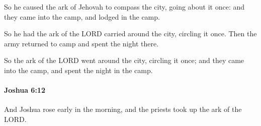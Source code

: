 			\begin{versebox}
					\item[BHS] 
					\item[ASV] So he caused the ark of Jehovah to compass the city, going about it once: and they came into the camp, and lodged in the camp.
					\item[NIV] So he had the ark of the LORD carried around the city, circling it once. Then the army returned to camp and spent the night there.
					\item[NRSV] So the ark of the LORD went around the city, circling it once; and they came into the camp, and spent the night in the camp.
			\end{versebox}

		\paragraph{Joshua 6:12} %
			\label{JOSHUA-6-12}

			And Joshua rose early in the morning, and the priests took up the ark of the LORD.

